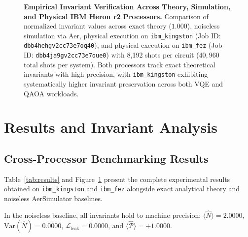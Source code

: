 \documentclass[aps,pra,reprint,superscriptaddress,floatfix,nofootinbib]{revtex4-2}
\begin{document}
\begin{figure}[t]
{\begin{tikzpicture}[
    xscale=1.0, yscale=4.5,
    font=\small,
    every node/.style={inner sep=0pt}
]
\end{tikzpicture}%
}
\caption{\textbf{Empirical Invariant Verification Across Theory, Simulation, and Physical IBM Heron r2 Processors.} Comparison of normalized invariant values across exact theory ($1.000$), noiseless simulation via Aer, physical execution on \texttt{ibm\_kingston} (Job ID: \texttt{dbb4hehgv2cc73e7oq40}), and physical execution on \texttt{ibm\_fez} (Job ID: \texttt{dbb4ja9gv2cc73e7oue0}) with 8,192 shots per circuit ($40,960$ total shots per system). Both processors track exact theoretical invariants with high precision, with \texttt{ibm\_kingston} exhibiting systematically higher invariant preservation across both VQE and QAOA workloads.}
\label{fig:results_bars}
\end{figure}

\section{Results and Invariant Analysis}

\subsection{Cross-Processor Benchmarking Results}
Table~\ref{tab:results} and Figure~\ref{fig:results_bars} present the complete experimental results obtained on \texttt{ibm\_kingston} and \texttt{ibm\_fez} alongside exact analytical theory and noiseless AerSimulator baselines.

In the noiseless baseline, all invariants hold to machine precision: $\langle \hat{N} \rangle = 2.0000$, $\text{Var}(\hat{N}) = 0.0000$, $\mathcal{L}_{\text{leak}} = 0.0000$, and $\langle \hat{\mathcal{P}} \rangle = +1.0000$.
\end{document}
